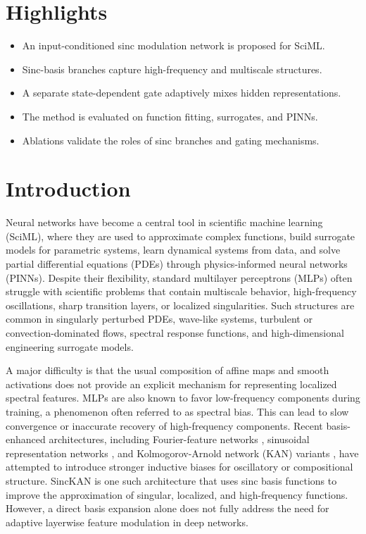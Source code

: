 \documentclass[preprint,12pt]{elsarticle}
\begin{document}
\section*{Highlights}
\begin{itemize}
  \item An input-conditioned sinc modulation network is proposed for SciML.
  \item Sinc-basis branches capture high-frequency and multiscale structures.
  \item A separate state-dependent gate adaptively mixes hidden representations.
  \item The method is evaluated on function fitting, surrogates, and PINNs.
  \item Ablations validate the roles of sinc branches and gating mechanisms.
\end{itemize}

\section{Introduction}

Neural networks have become a central tool in scientific machine learning (SciML), where they are used to approximate complex functions, build surrogate models for parametric systems, learn dynamical systems from data, and solve partial differential equations (PDEs) through physics-informed neural networks (PINNs). Despite their flexibility, standard multilayer perceptrons (MLPs) often struggle with scientific problems that contain multiscale behavior, high-frequency oscillations, sharp transition layers, or localized singularities. Such structures are common in singularly perturbed PDEs, wave-like systems, turbulent or convection-dominated flows, spectral response functions, and high-dimensional engineering surrogate models.

A major difficulty is that the usual composition of affine maps and smooth activations does not provide an explicit mechanism for representing localized spectral features. MLPs are also known to favor low-frequency components during training, a phenomenon often referred to as spectral bias. This can lead to slow convergence or inaccurate recovery of high-frequency components. Recent basis-enhanced architectures, including Fourier-feature networks \cite{tancik2020fourier}, sinusoidal representation networks \cite{sitzmann2020siren}, and Kolmogorov-Arnold network (KAN) variants \cite{liu2024kan}, have attempted to introduce stronger inductive biases for oscillatory or compositional structure. SincKAN \cite{yu2026sinckan} is one such architecture that uses sinc basis functions to improve the approximation of singular, localized, and high-frequency functions. However, a direct basis expansion alone does not fully address the need for adaptive layerwise feature modulation in deep networks.
\end{document}
